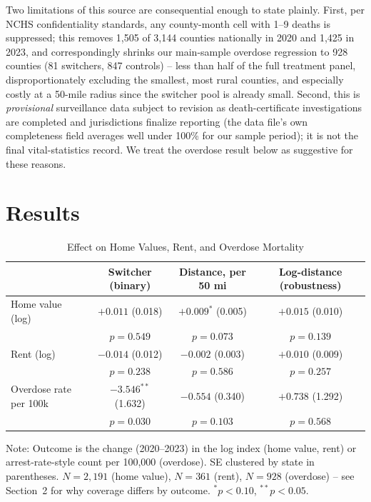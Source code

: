 \documentclass[11pt]{article}
\begin{document}
Two limitations of this source are consequential enough to state
plainly. First, per NCHS confidentiality standards, any county-month
cell with 1--9 deaths is suppressed; this removes 1,505 of 3,144
counties nationally in 2020 and 1,425 in 2023, and correspondingly
shrinks our main-sample overdose regression to 928 counties (81
switchers, 847 controls) -- less than half of the full treatment
panel, disproportionately excluding the smallest, most rural counties,
and especially costly at a 50-mile radius since the switcher pool is
already small. Second, this is \emph{provisional} surveillance data
subject to revision as death-certificate investigations are completed
and jurisdictions finalize reporting (the data file's own completeness
field averages well under 100\% for our sample period); it is not the
final vital-statistics record. We treat the overdose result below as
suggestive for these reasons.

\section{Results}

\begin{table}[htbp]
\centering
\caption{Effect on Home Values, Rent, and Overdose Mortality}
\label{tab:regD}
\begin{tabular}{@{}lccc@{}}
\toprule
 & Switcher (binary) & Distance, per 50 mi & Log-distance (robustness) \\
\midrule
Home value (log) & $+0.011$ (0.018) & $+0.009^{*}$ (0.005) & $+0.015$ (0.010) \\
 & $p=0.549$ & $p=0.073$ & $p=0.139$ \\
\addlinespace
Rent (log) & $-0.014$ (0.012) & $-0.002$ (0.003) & $+0.010$ (0.009) \\
 & $p=0.238$ & $p=0.586$ & $p=0.257$ \\
\addlinespace
Overdose rate per 100k & $-3.546^{**}$ (1.632) & $-0.554$ (0.340) & $+0.738$ (1.292) \\
 & $p=0.030$ & $p=0.103$ & $p=0.568$ \\
\bottomrule
\end{tabular}
\vspace{2pt}
\begin{minipage}{0.95\textwidth}
\footnotesize Note: Outcome is the change (2020--2023) in the log
index (home value, rent) or arrest-rate-style count per 100{,}000
(overdose). SE clustered by state in parentheses. $N=2{,}191$ (home
value), $N=361$ (rent), $N=928$ (overdose) -- see Section~2 for why
coverage differs by outcome. $^{*}p<0.10$, $^{**}p<0.05$.
\end{minipage}
\end{table}
\end{document}
